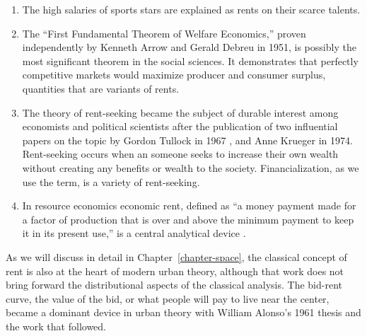 \begin{enumerate}

\item  %
The high salaries of sports stars are explained as rents on their scarce talents. %

\item The ``First Fundamental Theorem of Welfare Economics,'' proven independently by Kenneth Arrow \cite{arrowExtensionBasicTheorems1951} and  Gerald Debreu \cite{debreuCoefficientResourceUtilization1951}  in 1951, is possibly the most significant theorem in the social sciences. It demonstrates that perfectly competitive markets would maximize producer and consumer surplus, quantities that are variants of rents.

\item The theory of \gls{rent-seeking}  became the subject of durable interest among economists and political scientists after the publication of two influential papers on the topic by Gordon Tullock in 1967 \cite{tullockWelfareCostsTariffs1967}, and Anne Krueger \cite{kruegerPoliticalEconomyRentSeeking1974} in 1974. Rent-seeking occurs when an someone seeks to increase their own wealth without creating any benefits or wealth to the society. Financialization, as we use the term, is a variety of rent-seeking.

\item In resource economics \gls{economic rent}, defined as ``a money payment made for a factor of production that is over and above the minimum payment to keep it in its present use,'' is a central analytical device \cite{Gray1914RentUT}.   
    
\end{enumerate}

As we will discuss in detail in Chapter~\ref{chapter-space}, the classical concept of rent is also at the heart of modern urban theory, although that work does not bring forward the distributional aspects of the classical analysis. The \gls{bid-rent curve}, the value of the bid, or what people will pay to live near the center, became a dominant device in urban theory with William Alonso's 1961 thesis \cite{alonsoTheoryUrbanLand1960} and the work that followed. %


